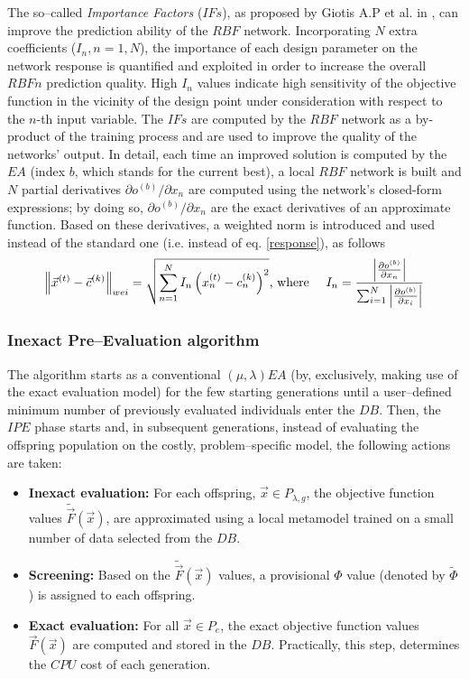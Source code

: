The so--called \textit{Importance Factors} ($IFs$), as proposed by Giotis A.P et al. in \cite{LTT_2_018}, can improve the prediction ability of the $RBF$ network. Incorporating $N$ extra coefficients ($I_n, n\!=\!1,N$), the importance of each design parameter on the network response is quantified and exploited in order to increase the overall $RBFn$ prediction quality. High $I_n$ values indicate high sensitivity of the objective function in the vicinity of the design point under consideration with respect to the $n$-th input variable. The $IFs$ are computed by the $RBF$ network as a by-product of the training process and are used to improve the quality of the networks' output. 
In detail, each time an improved solution is computed by the $EA$ (index $b$, which stands for the current best), a local $RBF$ network is built and $N$ partial derivatives $\partial o^{(b)} / \partial x_{n}$ are computed using the network's closed-form expressions; by doing so, $\partial o^{(b)} / \partial x_{n}$ are the exact derivatives of an approximate function. 
Based on these derivatives, a weighted norm is introduced and used instead of the standard one (i.e. instead of eq. \ref{response}), as follows
%
\begin{equation}\label{e:IFcomp}
    \left\|\vec x^{(t)}-\vec c^{(k)}\right\|_{wei} =
    \sqrt{  \sum_{n=1}^N I_n\left(x_n^{(t)}-c_n^{(k)}\right)^2  }
	\mbox{,~where~~~~}
    I_n = { {\left|  {\partial o^{(b)}} \over {\partial x_n} \right|} 
          \over 
  { \sum_{i=1}^{N} \left| {\partial o^{(b)}} \over {\partial x_i} \right| } }
\end{equation}


\subsubsection{Inexact Pre--Evaluation algorithm}


The algorithm starts as a conventional $(\mu, \lambda)EA$ (by, exclusively, making use of the exact evaluation model) for the few starting generations until a user--defined minimum number of previously evaluated individuals enter the $DB$. 
Then, the $IPE$ phase starts and, in subsequent generations, instead of evaluating the offspring population on the costly, problem--specific model, the following actions are taken:
\newcommand{\apprx}[1]{\tilde{#1}}
\begin{itemize}
\item[]{\bf Inexact evaluation:}
For each offspring, $\vec{x}\!\in\!P_{\lambda,g}$, the objective function values $\apprx{\vec{F}}(\vec{x})$, are approximated using a local metamodel trained on a small number of data selected from the $DB$. 
%
\item[]{\bf Screening:}
Based on the $\apprx{\vec{F}}(\vec{x})$ values, a provisional
$\Phi$ value (denoted by $\apprx{\Phi}$) is assigned to each
offspring.
\item[]{\bf Exact evaluation:}
For all $\vec{x}\!\in\!P_{e}$, the exact objective function values $\vec{F}(\vec{x})$ are computed and stored in the $DB$. 
Practically, this step, determines the $CPU$ cost of each generation.
\end{itemize}


